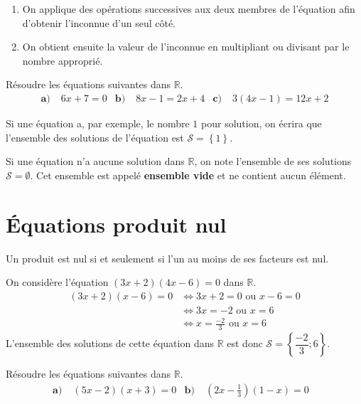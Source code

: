 \documentclass[11pt]{article}
\begin{document}
\begin{methode}
  \begin{enumerate}
    \item On applique des opérations successives aux deux membres de l'équation afin
      d'obtenir l'inconnue d'un seul côté.
    \item On obtient ensuite la valeur de l'inconnue en multipliant ou divisant
      par le nombre approprié.
  \end{enumerate}
\end{methode}
\begin{app}
  Résoudre les équations suivantes dans $\mathbb{R}$.
  \begin{align*}
    \textbf{a)}\;& 6x+7=0 &
    \textbf{b)}\;& 8x-1=2x+4 &
    \textbf{c)}\;& 3(4x-1) = 12x+2
  \end{align*}
\end{app}
\begin{notation}
  Si une équation a, par exemple, le nombre $1$ pour solution, on écrira que
  l'ensemble des solutions de l'équation est $\mathscr S=\left\{ 1
  \right\}$.
\end{notation}
\begin{notation}
  Si une équation n'a aucune solution dans $\mathbb{R}$, on note l'ensemble de
  ses solutions $\mathscr S=\emptyset$. Cet ensemble est appelé
  \textbf{ensemble vide} et ne contient aucun élément.
\end{notation}


\section{Équations produit nul}
\begin{prop}
  Un produit est nul si et seulement si l'un au moins de ses facteurs est nul.
\end{prop}
\begin{exemple}
  On considère l'équation $(3x+2)(4x-6)=0$ dans $\mathbb{R}$.
  \begin{align*}
    (3x+2)(x-6) = 0 &\Longleftrightarrow 3x+2 = 0\text{ ou } x-6=0 \\
    &\Longleftrightarrow 3x = -2 \text{ ou } x = 6 \\
    &\Longleftrightarrow x = \frac{-2}{3} \text{ ou } x = 6
  \end{align*}
  L'ensemble des solutions de cette équation dans $\mathbb{R}$ est donc
  $\mathscr S=\left\{ \dfrac{-2}{3}; 6 \right\}$.
\end{exemple}
\begin{app}
  Résoudre les équations suivantes dans $\mathbb{R}$.
  \begin{align*}
    \textbf{a)}\;& (5x-2)(x+3) = 0 &
    \textbf{b)}\;& \left(2x-\frac{1}{3}\right)(1-x) = 0 &
  \end{align*}
\end{app}
\end{document}
